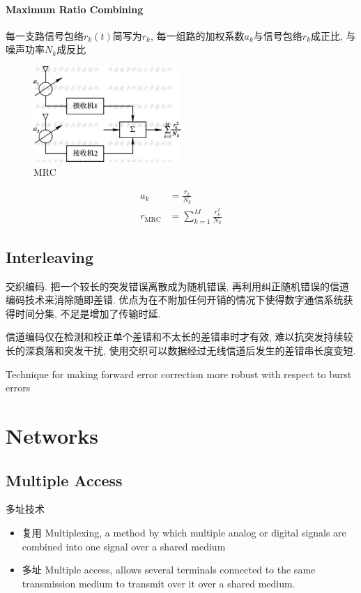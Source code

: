 \documentclass[a4paper]{report}
\begin{document}
\subsubsection{Maximum Ratio Combining}
每一支路信号包络$r_k(t)$简写为$r_k$, 每一组路的加权系数$a_k$与信号包络$r_k$成正比, 与噪声功率$N_k$成反比
\begin{figure}[H]
\centering
\includegraphics[width=0.5\textwidth]{mrc.jpg}
\caption{MRC}
\end{figure}

\begin{align*}
	a_k &= \frac{r_k}{N_k} \\
	r_{\text{MRC}}&=\sum_{k=1}^M \frac{r_k^2}{N_k}
\end{align*}

\section{Interleaving}
交织编码. 把一个较长的突发错误离散成为随机错误, 再利用纠正随机错误的信道编码技术来消除随即差错. 优点为在不附加任何开销的情况下使得数字通信系统获得时间分集, 不足是增加了传输时延. 

信道编码仅在检测和校正单个差错和不太长的差错串时才有效, 难以抗突发持续较长的深衰落和突发干扰, 使用交织可以数据经过无线信道后发生的差错串长度变短. 

Technique for making forward error correction more robust with respect to burst errors

\chapter{Networks}
\section{Multiple Access}
多址技术
\begin{itemize}
	\item 复用 Multiplexing, a method by which multiple analog or digital signals are combined into one signal over a shared medium
	\item 多址 Multiple access, allows several terminals connected to the same transmission medium to transmit over it over a shared medium.
\end{itemize}
\end{document}
